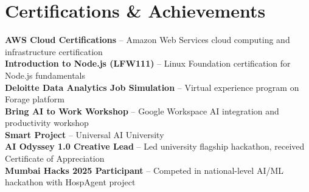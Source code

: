 \documentclass[letterpaper,10pt]{article}
\begin{document}
\section{Certifications \& Achievements}
 \begin{itemize}[leftmargin=0.15in, label={}]
    \small{\item{
     \textbf{AWS Cloud Certifications} -- Amazon Web Services cloud computing and infrastructure certification \\
     \textbf{Introduction to Node.js (LFW111)} -- Linux Foundation certification for Node.js fundamentals \\
     \textbf{Deloitte Data Analytics Job Simulation} -- Virtual experience program on Forage platform \\
     \textbf{Bring AI to Work Workshop} -- Google Workspace AI integration and productivity workshop \\
     \textbf{Smart Project} -- Universal AI University \\
     \textbf{AI Odyssey 1.0 Creative Lead} -- Led university flagship hackathon, received Certificate of Appreciation \\
     \textbf{Mumbai Hacks 2025 Participant} -- Competed in national-level AI/ML hackathon with HospAgent project
    }}
 \end{itemize}
\end{document}
